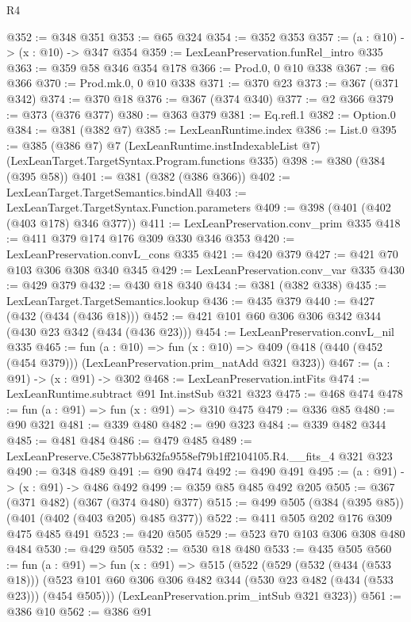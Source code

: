 \begin{lexlean}{R4}
\begin{coremodule}
@352 := @348 @351
@353 := @65 @324
@354 := @352 @353
@357 := (a : @10) -> (x : @10) -> @347 @354
@359 := LexLeanPreservation.funRel_intro @335
@363 := @359 @58 @346 @354 @178
@366 := Prod.{0, 0} @10 @338
@367 := @6 @366
@370 := Prod.mk.{0, 0} @10 @338
@371 := @370 @23
@373 := @367 (@371 @342)
@374 := @370 @18
@376 := @367 (@374 @340)
@377 := @2 @366
@379 := @373 (@376 @377)
@380 := @363 @379
@381 := Eq.refl.{1}
@382 := Option.{0}
@384 := @381 (@382 @7)
@385 := LexLeanRuntime.index
@386 := List.{0}
@395 := @385
    (@386 @7)
    @7
    (LexLeanRuntime.instIndexableList @7)
    (LexLeanTarget.TargetSyntax.Program.functions @335)
@398 := @380 (@384 (@395 @58))
@401 := @381 (@382 (@386 @366))
@402 := LexLeanTarget.TargetSemantics.bindAll
@403 := LexLeanTarget.TargetSyntax.Function.parameters
@409 := @398 (@401 (@402 (@403 @178) @346 @377))
@411 := LexLeanPreservation.conv_prim @335
@418 := @411 @379 @174 @176 @309 @330 @346 @353
@420 := LexLeanPreservation.convL_cons @335
@421 := @420 @379
@427 := @421 @70 @103 @306 @308 @340 @345
@429 := LexLeanPreservation.conv_var @335
@430 := @429 @379
@432 := @430 @18 @340
@434 := @381 (@382 @338)
@435 := LexLeanTarget.TargetSemantics.lookup
@436 := @435 @379
@440 := @427 (@432 (@434 (@436 @18)))
@452 := @421 @101 @60 @306 @306 @342 @344 (@430 @23 @342 (@434 (@436 @23)))
@454 := LexLeanPreservation.convL_nil @335
@465 := fun (a : @10) =>
  fun (x : @10) => @409 (@418 (@440 (@452 (@454 @379))) (LexLeanPreservation.prim_natAdd @321 @323))
@467 := (a : @91) -> (x : @91) -> @302
@468 := LexLeanPreservation.intFits
@474 := LexLeanRuntime.subtract @91 Int.instSub @321 @323
@475 := @468 @474
@478 := fun (a : @91) => fun (x : @91) => @310 @475
@479 := @336 @85
@480 := @90 @321
@481 := @339 @480
@482 := @90 @323
@484 := @339 @482 @344
@485 := @481 @484
@486 := @479 @485
@489 := LexLeanPreserve.C5e3877bb632fa9558ef79b1ff2104105.R4.__fits_4 @321 @323
@490 := @348 @489
@491 := @90 @474
@492 := @490 @491
@495 := (a : @91) -> (x : @91) -> @486 @492
@499 := @359 @85 @485 @492 @205
@505 := @367 (@371 @482) (@367 (@374 @480) @377)
@515 := @499 @505 (@384 (@395 @85)) (@401 (@402 (@403 @205) @485 @377))
@522 := @411 @505 @202 @176 @309 @475 @485 @491
@523 := @420 @505
@529 := @523 @70 @103 @306 @308 @480 @484
@530 := @429 @505
@532 := @530 @18 @480
@533 := @435 @505
@560 := fun (a : @91) =>
  fun (x : @91) =>
  @515
    (@522
      (@529
        (@532 (@434 (@533 @18)))
        (@523 @101 @60 @306 @306 @482 @344 (@530 @23 @482 (@434 (@533 @23))) (@454 @505)))
      (LexLeanPreservation.prim_intSub @321 @323))
@561 := @386 @10
@562 := @386 @91

\end{coremodule}
\end{lexlean}
